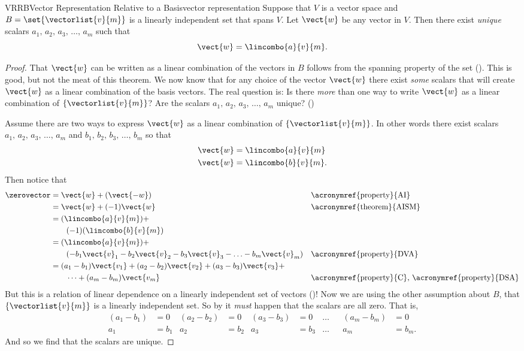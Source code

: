 %
\begin{theorem}{VRRB}{Vector Representation Relative to a Basis}{vector representation}
Suppose that $V$ is a vector space and $B=\set{\vectorlist{v}{m}}$ is a linearly independent set that spans $V$.  Let $\vect{w}$ be any vector in $V$.  Then there exist {\em unique} scalars $a_1,\,a_2,\,a_3,\,\ldots,\,a_m$ such that
%
\begin{equation*}
\vect{w}=\lincombo{a}{v}{m}.
\end{equation*}
%
\end{theorem}
%
\begin{proof}
That $\vect{w}$ can be written as a linear combination of the vectors in $B$ follows from the spanning property of the set ().  This is good, but not the meat of this theorem.  We now know that for any choice of the vector $\vect{w}$ there exist {\em some} scalars that will create $\vect{w}$ as a linear combination of the basis vectors.  The real question is:  Is there {\em more} than one way to write $\vect{w}$ as a linear combination of $\{\vectorlist{v}{m}\}$?  Are the scalars $a_1,\,a_2,\,a_3,\,\ldots,\,a_m$ unique?  ()\par
%
Assume there are two ways to express $\vect{w}$ as a linear combination of $\{\vectorlist{v}{m}\}$.  In other words there exist scalars $a_1,\,a_2,\,a_3,\,\ldots,\,a_m$ and $b_1,\,b_2,\,b_3,\,\ldots,\,b_m$ so that
%
\begin{align*}
\vect{w}&=\lincombo{a}{v}{m}\\
\vect{w}&=\lincombo{b}{v}{m}.
\end{align*}
%
Then notice that
%
\begin{align*}
\zerovector
&=\vect{w}+(\vect{-w})&&\text{\acronymref{property}{AI}}\\
%
&=\vect{w}+(-1)\vect{w}&&\text{\acronymref{theorem}{AISM}}\\
%
&=(\lincombo{a}{v}{m})+\\
&\quad\quad(-1)(\lincombo{b}{v}{m})\\
%
&=(\lincombo{a}{v}{m})+\\
&\quad\quad (-b_1\vect{v}_1-b_2\vect{v}_2-b_3\vect{v}_3-\ldots-b_m\vect{v}_m)&&\text{\acronymref{property}{DVA}}\\
%
&=(a_1-b_1)\vect{v_1}+(a_2-b_2)\vect{v_2}+(a_3-b_3)\vect{v_3}+\\
&\quad\quad\cdots+(a_m-b_m)\vect{v_m}&&\text{\acronymref{property}{C}, \acronymref{property}{DSA}}
\end{align*}
%
But this is a relation of linear dependence on a linearly independent set of vectors ()! Now we are using the other assumption about $B$, that $\{\vectorlist{v}{m}\}$ is a linearly independent set.   So by  it {\em must} happen that the scalars are all zero.  That is,
%
\begin{align*}
(a_1-b_1)&=0&(a_2-b_2)&=0&(a_3-b_3)&=0&\ldots&&(a_m-b_m)&=0\\
a_1&=b_1&a_2&=b_2&a_3&=b_3&\ldots&&a_m&=b_m.
\end{align*}
%
And so we find that the scalars are unique.
%
\end{proof}

